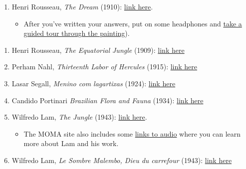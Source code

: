 \documentclass[
  12pt,
  letterpaper,
  DIV=11,
  numbers=noendperiod]{scrreprt}
\providecommand{\tightlist}{%
  \setlength{\itemsep}{0pt}\setlength{\parskip}{0pt}}
\begin{document}
\begin{enumerate}
\def\labelenumi{\arabic{enumi}.}
\setcounter{enumi}{11}
\item
  Henri Rousseau, \emph{The Dream} (1910):
  \href{https://en.wikipedia.org/wiki/Henri_Rousseau\#/media/File:Henri_Rousseau_-_Le_R\%C3\%AAve_-_Google_Art_Project.jpg}{link
  here}.

  \begin{itemize}
  \tightlist
  \item
    After you've written your answers, put on some headphones and
    \href{https://artsandculture.google.com/story/xwVxpOh7XnK4bQ}{take a
    guided tour through the painting}).
  \end{itemize}
\end{enumerate}

\begin{enumerate}
\def\labelenumi{\arabic{enumi}.}
\setcounter{enumi}{12}
\item
  Henri Rousseau, \emph{The Equatorial Jungle} (1909):
  \href{https://artsandculture.google.com/asset/the-equatorial-jungle-henri-rousseau/cwFWCSzNtFX8ew}{link
  here}
\item
  Perham Nahl, \emph{Thirteenth Labor of Hercules} (1915):
  \href{https://www.artsy.net/artwork/perham-wilhelm-nahl-the-thirteenth-labor-of-hercules-official-poster-for-the-panama-pacific-international-exposition}{link
  here}
\item
  Lasar Segall, \emph{Menino com lagartixas} (1924):
  \href{https://artsandculture.google.com/asset/menino-com-lagartixas-lasar-segall/lAEC6kbwDCYW_A}{link
  here}
\item
  Candido Portinari \emph{Brazilian Flora and Fauna} (1934):
  \href{https://artsandculture.google.com/asset/brazilian-flora-and-fauna/dQFZBwYjfMCjsA}{link
  here}
\item
  Wilfredo Lam, \emph{The Jungle} (1943):
  \href{https://www.wikiart.org/en/wifredo-lam/the-jungle-1943}{link
  here}.

  \begin{itemize}
  \tightlist
  \item
    The MOMA site also includes some
    \href{https://www.moma.org/collection/works/34666}{links to audio}
    where you can learn more about Lam and his work.
  \end{itemize}
\item
  Wilfredo Lam, \emph{Le Sombre Malembo, Dieu du carrefour} (1943):
  \href{https://www.wikiart.org/en/wifredo-lam/le-sombre-malembo-dieu-du-carrefour-1943}{link
  here}
\end{enumerate}
\end{document}
